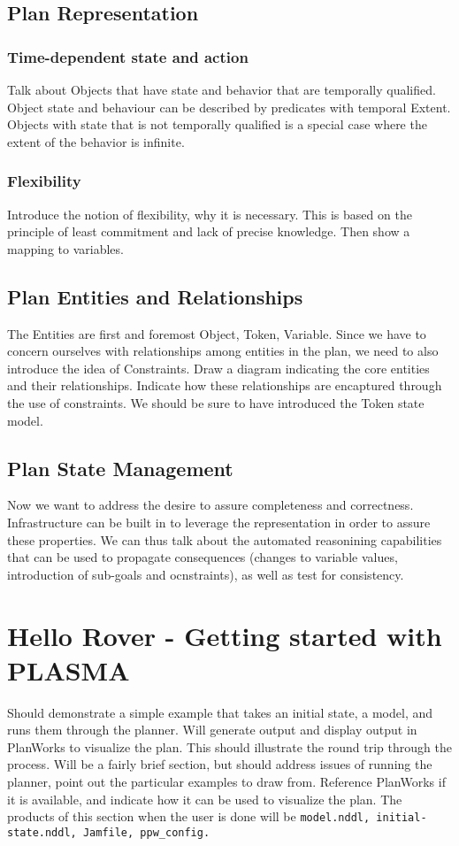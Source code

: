 \documentclass[10pt, letterpaper, twoside]{article}
\begin{document}
\subsection{Plan Representation}
\subsubsection{Time-dependent state and action}
Talk about Objects that have state and behavior that are temporally qualified. Object state and behaviour can be described by predicates with temporal Extent. Objects with state that is not temporally qualified is a special case where the extent of the behavior is infinite.
\subsubsection{Flexibility}
Introduce the notion of flexibility, why it is necessary. This is based on the principle of least commitment and lack of precise knowledge. Then show a mapping to variables.
\subsection{Plan Entities and Relationships}
The Entities are first and foremost Object, Token, Variable. Since we have to concern ourselves with relationships among entities in the plan, we need to also introduce the idea of Constraints. Draw a diagram indicating the core entities and their relationships. Indicate how these relationships are encaptured through the use of constraints. We should be sure to have introduced the Token state model.
\subsection{Plan State Management}
Now we want to address the desire to assure completeness and correctness. Infrastructure can be built in to leverage the representation in order to assure these properties. We can thus talk about the automated reasonining capabilities that can be used to propagate consequences (changes to variable values, introduction of sub-goals and ocnstraints), as well as test for consistency.

\section{Hello Rover - Getting started with PLASMA}
Should demonstrate a simple example that takes an initial state, a model, and runs them through the planner. Will generate output and display output in PlanWorks to visualize the plan. This should illustrate the round trip through the process. Will be a fairly brief section, but should address issues of running the planner, point out the particular examples to draw from. Reference PlanWorks if it is available, and indicate how it can be used to visualize the plan. The products of this section when the user is done will be \verb!model.nddl, initial-state.nddl, Jamfile, ppw_config.!
\end{document}
